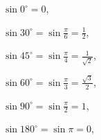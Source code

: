 $\sin 0^{\circ} = 0$,
\par
$\sin 30^{\circ} = \sin \frac{\pi}{6} = \frac{1}{2}$,
\par
$\sin 45^{\circ} = \sin \frac{\pi}{4} = \frac{1}{\sqrt{2}}$,
\par
$\sin 60^{\circ} = \sin \frac{\pi}{3} = \frac{\sqrt{3}}{2}$,
\par
$\sin 90^{\circ} = \sin \frac{\pi}{2} = 1$,
\par
$\sin 180^{\circ} = \sin \pi = 0$,